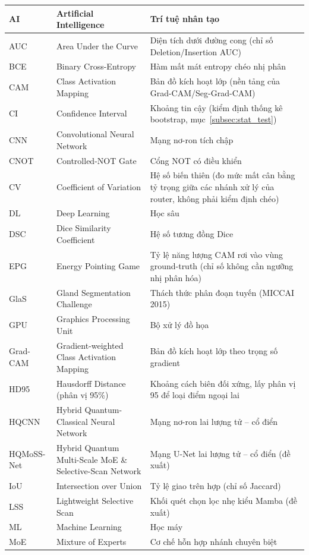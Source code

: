 \begin{center}
\begin{longtable}{|p{2.4cm}|p{5.4cm}|p{5.4cm}|}
AI & Artificial Intelligence & Trí tuệ nhân tạo \\ \hline
AUC & Area Under the Curve & Diện tích dưới đường cong (chỉ số Deletion/Insertion AUC) \\ \hline
BCE & Binary Cross-Entropy & Hàm mất mát entropy chéo nhị phân \\ \hline
CAM & Class Activation Mapping & Bản đồ kích hoạt lớp (nền tảng của Grad-CAM/Seg-Grad-CAM) \\ \hline
CI & Confidence Interval & Khoảng tin cậy (kiểm định thống kê bootstrap, mục~\ref{subsec:stat_test}) \\ \hline
CNN & Convolutional Neural Network & Mạng nơ-ron tích chập \\ \hline
CNOT & Controlled-NOT Gate & Cổng NOT có điều khiển \\ \hline
CV & Coefficient of Variation & Hệ số biến thiên (đo mức mất cân bằng tỷ trọng giữa các nhánh xử lý của router, không phải kiểm định chéo) \\ \hline
DL & Deep Learning & Học sâu \\ \hline
DSC & Dice Similarity Coefficient & Hệ số tương đồng Dice \\ \hline
EPG & Energy Pointing Game & Tỷ lệ năng lượng CAM rơi vào vùng ground-truth (chỉ số không cần ngưỡng nhị phân hóa) \\ \hline
GlaS & Gland Segmentation Challenge & Thách thức phân đoạn tuyến (MICCAI 2015) \\ \hline
GPU & Graphics Processing Unit & Bộ xử lý đồ họa \\ \hline
Grad-CAM & Gradient-weighted Class Activation Mapping & Bản đồ kích hoạt lớp theo trọng số gradient \\ \hline
HD95 & Hausdorff Distance (phân vị 95\%) & Khoảng cách biên đối xứng, lấy phân vị 95 để loại điểm ngoại lai \\ \hline
HQCNN & Hybrid Quantum-Classical Neural Network & Mạng nơ-ron lai lượng tử -- cổ điển \\ \hline
HQMoSS-Net & Hybrid Quantum Multi-Scale MoE \& Selective-Scan Network & Mạng U-Net lai lượng tử -- cổ điển (đề xuất) \\ \hline
IoU & Intersection over Union & Tỷ lệ giao trên hợp (chỉ số Jaccard) \\ \hline
LSS & Lightweight Selective Scan & Khối quét chọn lọc nhẹ kiểu Mamba (đề xuất) \\ \hline
ML & Machine Learning & Học máy \\ \hline
MoE & Mixture of Experts & Cơ chế hỗn hợp nhánh chuyên biệt \\ \hline

\end{longtable}
\end{center}
